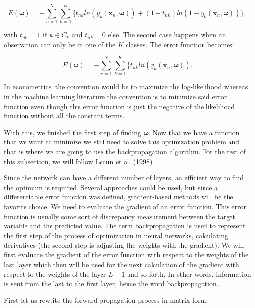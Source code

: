 \documentclass[a4paper,12pt]{article}
\numberwithin{equation}{section}
\begin{document}
\begin{equation}\label{eq:11}
E(\boldsymbol{\omega}) = -\sum_{n=1}^{N}\sum_{k=1}^{K} \{t_{nk} ln ( y_{k}(\boldsymbol{x}_{n},\boldsymbol{\omega} ) )+(1-t_{nk}) ln (1 - y_{k}(\boldsymbol{x}_{n},\boldsymbol{\omega}) ) \},
\end{equation}

with $t_{nk} = 1$ if $n \in C_k $ and $t_{nk} = 0$ else. The second case happens when an observation can only be in one of the $K$ classes. The error function becomes:

\begin{equation*}
E(\boldsymbol{\omega}) = -\sum_{n=1}^{N}\sum_{k=1}^{K} \{t_{nk} ln ( y_{k}(\boldsymbol{x}_{n},\boldsymbol{\omega} ) ).
\end{equation*}



In econometrics, the convention would be to maximize the log-likelihood whereas in the machine learning literature the convention is to minimize said error function even though this error function is just the negative of the likelihood function without all the constant terms.

With this, we finished the first step of finding $\boldsymbol{\omega}$. Now that we have a function that we want to minimize we still need to solve this optimization problem and that is where we are going to use the backpropagation algorithm. For the rest of this subsection, we will follow Lecun et al. (1998) 

Since the network can have a different number of layers, an efficient way to find the optimum is required. Several approaches could be used, but since a differentiable error function was defined, gradient-based methods will be the favorite choice. We need to evaluate the gradient of an error function. This error function is usually some sort of discrepancy measurement between the target variable and the predicted value. The term backpropagation is used to represent the first step of the process of optimization in neural networks, calculating derivatives (the second step is adjusting the weights with the gradient). We will first evaluate the gradient of the error function with respect to the weights of the last layer which then will be used for the next calculation of the gradient with respect to the weights of the layer $L-1$ and so forth. In other words, information is sent from the last to the first layer, hence the word backpropagation.

First let us rewrite the forward propagation process in matrix form:
\end{document}
